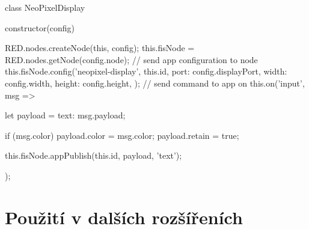 \begin{code}[
    language=Javascript,
    label=code:fis-node-neopixel-display,
    caption={Implementace bloku pro aplikaci ovládající bodový displej -- kromě samotné konfigurace na cílovém uzlu
    si uzel zaregistruje funkci pro odběr události typu \ic{\'input\'}.
    Událost tohoto typu notifikuje blok o~příchozí zprávě, která je v~tomto případě odeslána do aplikace k~zobrazení
    na displeji.}
]
class NeoPixelDisplay {
    constructor(config) {
        RED.nodes.createNode(this, config);
        this.fisNode = RED.nodes.getNode(config.node);
        // send app configuration to node
        this.fisNode.config('neopixel-display', this.id, {
            port: config.displayPort,
            width: config.width,
            height: config.height,
        });
        // send command to app on
        this.on('input', msg => {
            let payload = {text: msg.payload};

            if (msg.color)
                payload.color = msg.color;
            payload.retain = true;

            this.fisNode.appPublish(this.id, payload, 'text');
        });
    }
}
\end{code}

\section{Použití v dalších rozšířeních}\label{sec:pouziti-v-dalsich-rozsirenich}

